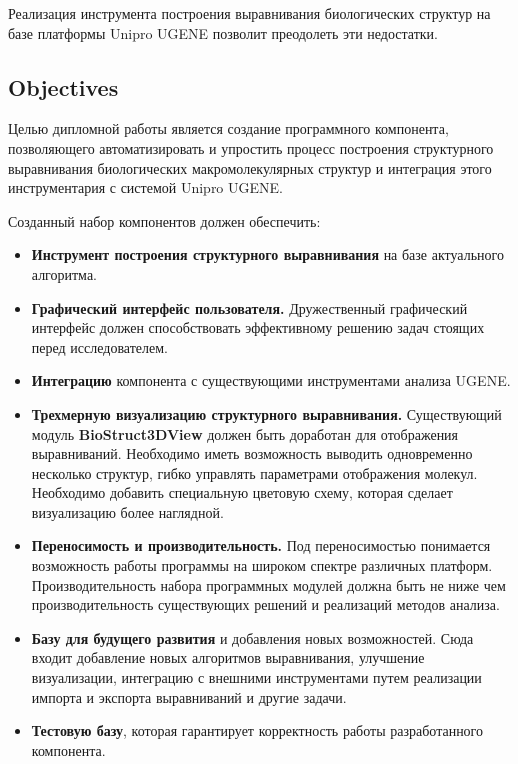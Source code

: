 \documentclass[a4paper, 12pt, titlepage, utf8]{extarticle}
\newcommand{\class}{\textbf}
\newcommand{\module}{\class}
\begin{document}
\begin{original}
\begin{original}
Реализация инструмента построения выравнивания биологических структур на базе
платформы Unipro UGENE позволит преодолеть эти недостатки.

\subsection{Objectives}
Целью дипломной работы является создание программного компонента, позволяющего
автоматизировать и упростить процесс построения структурного выравнивания
биологических макромолекулярных структур и интеграция этого инструментария с
системой Unipro UGENE.

Созданный набор компонентов должен обеспечить:
\begin{itemize}
    \item \textbf{Инструмент построения структурного выравнивания} на базе
актуального алгоритма.

    \item \textbf{Графический интерфейс пользователя.} Дружественный графический
интерфейс должен способствовать эффективному решению задач стоящих перед
исследователем.

    \item \textbf{Интеграцию} компонента с существующими инструментами анализа
UGENE.

    \item \textbf{Трехмерную визуализацию структурного выравнивания.}
Существующий модуль \module{BioStruct3DView} должен быть доработан для
отображения выравниваний. Необходимо иметь возможность выводить одновременно
несколько структур, гибко управлять параметрами отображения молекул. Необходимо
добавить специальную цветовую схему, которая сделает визуализацию более
наглядной.

    \item \textbf{Переносимость и производительность.} Под переносимостью
понимается возможность работы программы на широком спектре различных платформ.
Производительность набора программных модулей должна быть не ниже чем
производительность существующих решений и реализаций методов анализа.

    \item \textbf{Базу для будущего развития} и добавления новых возможностей.
Сюда входит добавление новых алгоритмов выравнивания, улучшение визуализации,
интеграцию с внешними инструментами путем реализации импорта и экспорта
выравниваний и другие задачи.

    \item \textbf{Тестовую базу}, которая гарантирует корректность работы
разработанного компонента.
\end{itemize}



\end{original}
\end{original}
\end{document}

